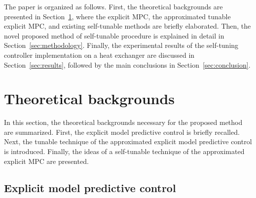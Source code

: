 \documentclass[preprint,12pt]{elsarticle}
\begin{document}
	The paper is organized as follows. First, the theoretical backgrounds are presented in Section~\ref{sec:preliminaries}, where the explicit MPC, the approximated tunable explicit MPC, and existing self-tunable methods are briefly elaborated. Then, the novel proposed method of self-tunable procedure is explained in detail in Section~\ref{sec:methodology}. Finally, the experimental results of the self-tuning controller implementation on a heat exchanger are discussed in Section~\ref{sec:results}, followed by the main conclusions in Section~\ref{sec:conclusion}.
	
	\section{Theoretical backgrounds}
	\label{sec:preliminaries}
	
	In this section, the theoretical backgrounds necessary for the proposed method are summarized. First, the explicit model predictive control is briefly recalled. Next, the tunable technique of the approximated explicit model predictive control is introduced. Finally, the ideas of a self-tunable technique of the approximated explicit MPC are presented.
	
	\subsection{Explicit model predictive control}
	\label{sec:eMPC}
	
\end{document}
